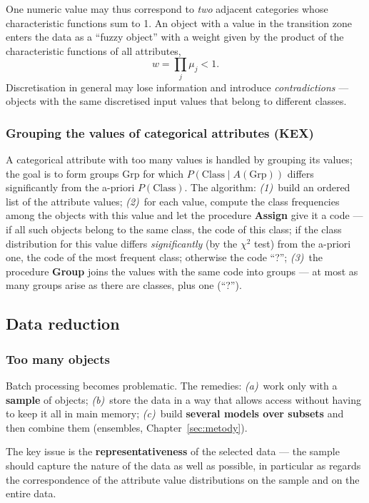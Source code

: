 \documentclass[11pt,a4paper]{article}
\theoremstyle{definition}
\providecommand{\uv}[1]{``#1''}
\begin{document}
One numeric value may thus correspond to \emph{two} adjacent categories whose characteristic
functions sum to 1. An object with a value in the transition zone enters the data as a
\uv{fuzzy object} with a weight given by the product of the characteristic functions of all
attributes,
\[ w = \prod_j \mu_j < 1. \]
Discretisation in general may lose information and introduce \emph{contradictions} --- objects
with the same discretised input values that belong to different classes.

\subsubsection{Grouping the values of categorical attributes (KEX)}

A categorical attribute with too many values is handled by grouping its values; the goal is to
form groups $\mathrm{Grp}$ for which $P(\mathrm{Class}\mid A(\mathrm{Grp}))$ differs
significantly from the a-priori $P(\mathrm{Class})$. The algorithm: \emph{(1)}~build an ordered
list of the attribute values; \emph{(2)}~for each value, compute the class frequencies among
the objects with this value and let the procedure \textbf{Assign} give it a code --- if all
such objects belong to the same class, the code of this class; if the class distribution for
this value differs \emph{significantly} (by the $\chi^2$ test) from the a-priori one, the code
of the most frequent class; otherwise the code \uv{?}; \emph{(3)}~the procedure \textbf{Group}
joins the values with the same code into groups --- at most as many groups arise as there are
classes, plus one (\uv{?}).

\subsection{Data reduction}

\subsubsection{Too many objects}

Batch processing becomes problematic. The remedies: \emph{(a)}~work only with a \textbf{sample}
of objects; \emph{(b)}~store the data in a way that allows access without having to keep it all
in main memory; \emph{(c)}~build \textbf{several models over subsets} and then combine them
(ensembles, Chapter~\ref{sec:metody}).

The key issue is the \textbf{representativeness} of the selected data --- the sample should
capture the nature of the data as well as possible, in particular as regards the correspondence
of the attribute value distributions on the sample and on the entire data.
\end{document}
